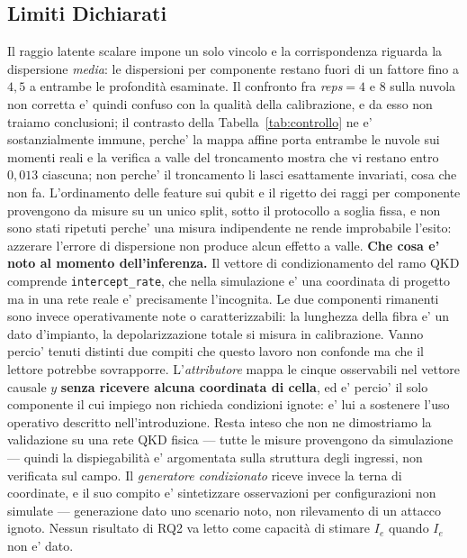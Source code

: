 \documentclass[10pt,conference,a4paper,twocolumn]{IEEEtran}
\begin{document}
\subsection{Limiti Dichiarati}
\label{sec:limiti}

Il raggio latente scalare impone un solo vincolo e la corrispondenza riguarda la dispersione \emph{media}: le dispersioni per componente restano fuori di un fattore fino a $4{,}5$ a entrambe le profondità esaminate. Il confronto fra \textit{reps}$=4$ e $8$ sulla nuvola non corretta e' quindi confuso con la qualità della calibrazione, e da esso non traiamo conclusioni; il contrasto della Tabella~\ref{tab:controllo} ne e' sostanzialmente immune, perche' la mappa affine porta entrambe le nuvole sui momenti reali e la verifica a valle del troncamento mostra che vi restano entro $0{,}013$ ciascuna; non perche' il troncamento li lasci esattamente invariati, cosa che non fa. L'ordinamento delle feature sui qubit e il rigetto dei raggi per componente provengono da misure su un unico split, sotto il protocollo a soglia fissa, e non sono stati ripetuti perche' una misura indipendente ne rende improbabile l'esito: azzerare l'errore di dispersione non produce alcun effetto a valle. \textbf{Che cosa e' noto al momento dell'inferenza.} Il vettore di condizionamento del ramo QKD comprende \texttt{intercept\_rate}, che nella simulazione e' una coordinata di progetto ma in una rete reale e' precisamente l'incognita. Le due componenti rimanenti sono invece operativamente note o caratterizzabili: la lunghezza della fibra e' un dato d'impianto, la depolarizzazione totale si misura in calibrazione. Vanno percio' tenuti distinti due compiti che questo lavoro non confonde ma che il lettore potrebbe sovrapporre. L'\emph{attributore} mappa le cinque osservabili nel vettore causale $y$ \textbf{senza ricevere alcuna coordinata di cella}, ed e' percio' il solo componente il cui impiego non richieda condizioni ignote: e' lui a sostenere l'uso operativo descritto nell'introduzione. Resta inteso che non ne dimostriamo la validazione su una rete QKD fisica — tutte le misure provengono da simulazione — quindi la dispiegabilità e' argomentata sulla struttura degli ingressi, non verificata sul campo. Il \emph{generatore condizionato} riceve invece la terna di coordinate, e il suo compito e' sintetizzare osservazioni per configurazioni non simulate — generazione dato uno scenario noto, non rilevamento di un attacco ignoto. Nessun risultato di RQ2 va letto come capacità di stimare $I_e$ quando $I_e$ non e' dato.
\end{document}
